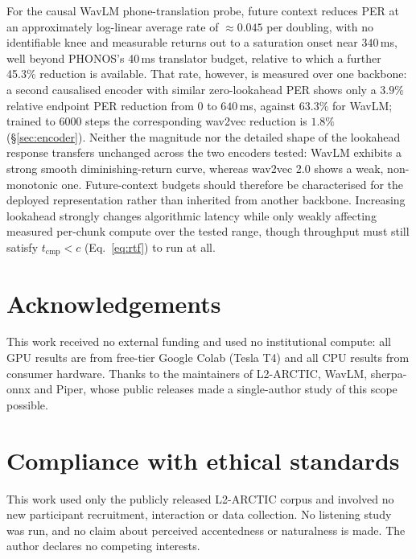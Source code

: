 \documentclass[journal]{IEEEtran}
\newcommand{\tcmp}{\ensuremath{t_{\mathrm{cmp}}}}
\begin{document}
For the causal WavLM phone-translation probe, future context reduces PER at an
approximately log-linear average rate of ${\approx}0.045$ per doubling, with no
identifiable knee and measurable returns out to a saturation onset near
$340$\,ms, well beyond PHONOS's 40\,ms translator budget, relative
to which a further 45.3\% reduction is available. That rate, however, is measured
over one backbone: a second causalised encoder with similar zero-lookahead PER
shows only a $3.9\%$ relative endpoint PER reduction from $0$ to $640$\,ms,
against $63.3\%$ for WavLM; trained to 6000 steps the corresponding wav2vec
reduction is $1.8\%$ (\S\ref{sec:encoder}). Neither the magnitude nor the detailed shape of the
lookahead response transfers unchanged across the two encoders tested: WavLM
exhibits a strong smooth diminishing-return curve, whereas wav2vec 2.0 shows a
weak, non-monotonic one. Future-context budgets should therefore be
characterised for the deployed representation rather than inherited from
another backbone. Increasing lookahead strongly changes algorithmic latency
while only weakly affecting measured per-chunk compute over the tested range,
though throughput must still satisfy $\tcmp<c$
(Eq.~\ref{eq:rtf}) to run at all.

\section{Acknowledgements}

This work received no external funding and used no institutional compute: all
GPU results are from free-tier Google Colab (Tesla T4) and all CPU results from
consumer hardware. Thanks to the maintainers of L2-ARCTIC, WavLM, sherpa-onnx
and Piper, whose public releases made a single-author study of this scope
possible.

\section{Compliance with ethical standards}

This work used only the publicly released L2-ARCTIC corpus and involved no new
participant recruitment, interaction or data collection. No listening study
was run, and no claim about perceived accentedness or naturalness is made. The author declares no competing interests.



\end{document}

